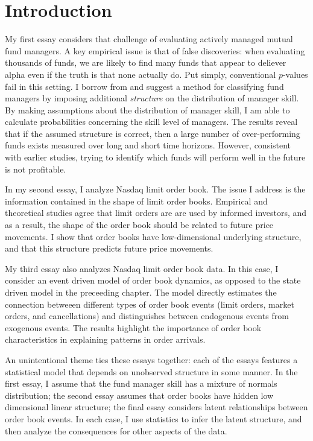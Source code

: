 \chapter{Introduction}
\label{chapter:one}

My first essay considers that challenge of evaluating actively managed mutual fund managers. A key empirical issue is that of false discoveries: when evaluating thousands of funds, we are likely to find many funds that appear to deliever alpha even if the truth is that none actually do. Put simply, conventional $p$-values fail in this setting. I borrow from \citet{Barras2010} and suggest a method for classifying fund managers by imposing additional \textit{structure} on the distribution of manager skill. By making assumptions about the distribution of manager skill, I am able to calculate probabilities concerning the skill level of managers. The results reveal that if the assumed structure is correct, then a large number of over-performing funds exists measured over long and short time horizons. However, consistent with earlier studies, trying to identify which funds will perform well in the future is not profitable.

In my second essay, I analyze Nasdaq limit order book. The issue I address is the information contained in the shape of limit order books. Empirical and theoretical studies agree that limit orders are are used by informed investors, and as a result, the shape of the order book should be related to future price movements. I show that order books have low-dimensional underlying structure, and that this structure predicts future price movements.

My third essay also analyzes Nasdaq limit order book data. In this case, I consider an event driven model of order book dynamics, as opposed to the state driven model in the preceeding chapter. The model directly estimates the connection betweeen different types of order book events (limit orders, market orders, and cancellations) and distinguishes between endogenous events from exogenous events. The results highlight the importance of order book characteristics in explaining patterns in order arrivals.

An unintentional theme ties these essays together: each of the essays features a statistical model that depends on unobserved structure in some manner. In the first essay, I assume that the fund manager skill has a mixture of normals distribution; the second essay assumes that order books have hidden low dimensional linear structure; the final essay considers latent relationships between order book events. In each case, I use statistics to infer the latent structure, and then analyze the consequences for other aspects of the data.

